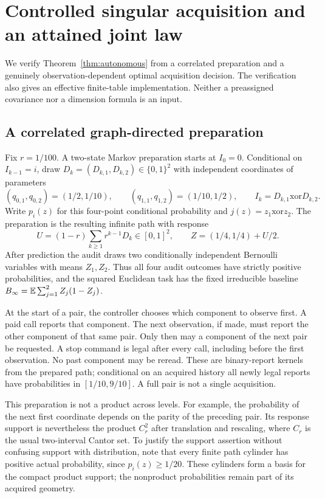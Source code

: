\section{Controlled singular acquisition and an attained joint law}\label{sec:controlledrefinement}
We verify Theorem~\ref{thm:autonomous} from a correlated preparation and a genuinely observation-dependent optimal acquisition decision. The verification also gives an effective finite-table implementation. Neither a preassigned covariance nor a dimension formula is an input.

\subsection{A correlated graph-directed preparation}
Fix $r=1/100$. A two-state Markov preparation starts at $I_0=0$. Conditional on $I_{k-1}=i$, draw $D_k=(D_{k,1},D_{k,2})\in\{0,1\}^2$ with independent coordinates of parameters
\[
 (q_{0,1},q_{0,2})=(1/2,1/10),\qquad
 (q_{1,1},q_{1,2})=(1/10,1/2),
 \qquad I_k=D_{k,1}\mathbin{\mathrm{xor}}D_{k,2}.
\]
Write $p_i(z)$ for this four-point conditional probability and $j(z)=z_1\mathbin{\mathrm{xor}}z_2$. The preparation is the resulting infinite path with response
\begin{equation}\label{eq:markovresponse}
 U=(1-r)\sum_{k\ge1}r^{k-1}D_k\in[0,1]^2,\qquad
 Z=(1/4,1/4)+U/2.
\end{equation}
After prediction the audit draws two conditionally independent Bernoulli variables with means $Z_1,Z_2$. Thus all four audit outcomes have strictly positive probabilities, and the squared Euclidean task has the fixed irreducible baseline $B_\infty=\mathbb E\sum_{j=1}^2 Z_j(1-Z_j)$.

At the start of a pair, the controller chooses which component to observe first. A paid call reports that component. The next observation, if made, must report the other component of that same pair. Only then may a component of the next pair be requested. A stop command is legal after every call, including before the first observation. No past component may be reread. These are binary-report kernels from the prepared path; conditional on an acquired history all newly legal reports have probabilities in $[1/10,9/10]$. A full pair is not a single acquisition.

This preparation is not a product across levels. For example, the probability of the next first coordinate depends on the parity of the preceding pair. Its response support is nevertheless the product $C_r^2$ after translation and rescaling, where $C_r$ is the usual two-interval Cantor set. To justify the support assertion without confusing support with distribution, note that every finite path cylinder has positive actual probability, since $p_i(z)\ge1/20$. These cylinders form a basis for the compact product support; the nonproduct probabilities remain part of its acquired geometry.

